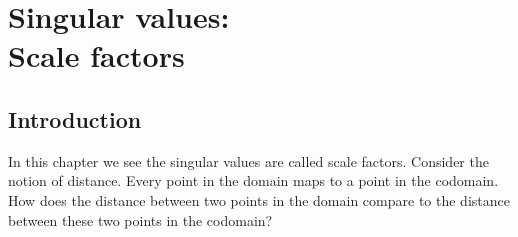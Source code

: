 \chapter[Singular values: Scale factors]{Singular values:\\ Scale factors}

\section{Introduction}
In this chapter we see the singular values are called scale factors. Consider the notion of distance. Every point in the domain maps to a point in the codomain. How does the distance between two points in the domain compare to the distance between these two points in the codomain?





%
%

\endinput